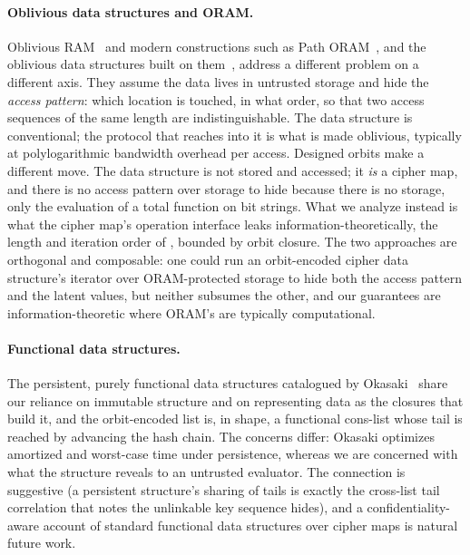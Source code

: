 \documentclass[11pt]{article}
\theoremstyle{definition}
\theoremstyle{plain}
\theoremstyle{definition}
\theoremstyle{remark}
\begin{document}
\paragraph{Oblivious data structures and ORAM.} Oblivious
RAM~\cite{goldreich1996software} and modern constructions such as Path
ORAM~\cite{stefanov2013path}, and the oblivious data structures built
on them~\cite{wang2014oblivious}, address a different problem on a
different axis. They assume the data lives in untrusted storage and
hide the \emph{access pattern}: which location is touched, in what
order, so that two access sequences of the same length are
indistinguishable. The data structure is conventional; the protocol
that reaches into it is what is made oblivious, typically at
polylogarithmic bandwidth overhead per access. Designed orbits make a
different move. The data structure is not stored and accessed; it
\emph{is} a cipher map, and there is no access pattern over storage to
hide because there is no storage, only the evaluation of a total
function on bit strings. What we analyze instead is what the cipher
map's operation interface leaks information-theoretically, the length
and iteration order of , bounded by orbit closure.
The two approaches are orthogonal and composable: one could run an
orbit-encoded cipher data structure's iterator over ORAM-protected
storage to hide both the access pattern and the latent values, but
neither subsumes the other, and our guarantees are information-theoretic
where ORAM's are typically computational.

\paragraph{Functional data structures.} The persistent, purely
functional data structures catalogued by Okasaki~\cite{okasaki1998purely}
share our reliance on immutable structure and on representing data as
the closures that build it, and the orbit-encoded list is, in shape, a
functional cons-list whose tail is reached by advancing the hash chain.
The concerns differ: Okasaki optimizes amortized and worst-case time
under persistence, whereas we are concerned with what the structure
reveals to an untrusted evaluator. The connection is suggestive (a
persistent structure's sharing of tails is exactly the cross-list tail
correlation that  notes the unlinkable key sequence
hides), and a confidentiality-aware account of standard functional data
structures over cipher maps is natural future work.
\end{document}
